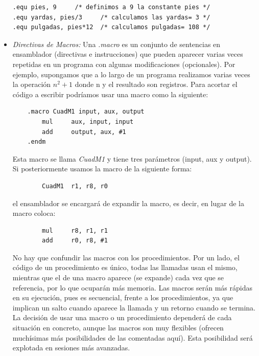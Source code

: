 \begin{itemize}
\begin{lstlisting}
.equ pies, 9     /* definimos a 9 la constante pies */
.equ yardas, pies/3     /* calculamos las yardas= 3 */
.equ pulgadas, pies*12  /* calculamos pulgadas= 108 */
\end{lstlisting}

     \item \textit{Directivas de Macros:} Una {\it .macro} es un
conjunto de sentencias en ensamblador (directivas e instrucciones) que
pueden aparecer varias veces repetidas en un programa con algunas
modificaciones (opcionales). Por ejemplo, supongamos que a lo largo de
un programa realizamos varias veces la operación $n^{2}+1$ donde n y el
resultado son registros. Para acortar el código a escribir
podríamos usar una macro como la siguiente:

\begin{lstlisting}
    .macro CuadM1 input, aux, output
        mul     aux, input, input
        add     output, aux, #1
    .endm    
\end{lstlisting}

Esta macro se llama {\it CuadM1} y tiene tres parámetros (input, aux y output).
Si posteriormente usamos la macro de la siguiente forma:

\begin{lstlisting}
        CuadM1  r1, r8, r0
\end{lstlisting}

\noindent el ensamblador se encargará de expandir la macro, es decir, en lugar de
la macro coloca:

\begin{lstlisting}
        mul     r8, r1, r1
        add     r0, r8, #1
\end{lstlisting}

No hay que confundir las macros con los procedimientos. Por un lado,
el código de un procedimiento es único, todas las llamadas usan el
mismo, mientras que el de una macro aparece (se expande) cada vez que
se referencia, por lo que ocuparán más memoria. Las macros serán
más rápidas en su ejecución, pues es secuencial, frente a
los procedimientos, ya que implican un salto cuando aparece la llamada
y un retorno cuando se termina. La decisión de usar una macro o un
procedimiento dependerá de cada situación en concreto, aunque las
macros son muy flexibles (ofrecen muchísimas más posibilidades de las
comentadas aquí). Esta posibilidad será explotada en sesiones más avanzadas.

\end{itemize}

